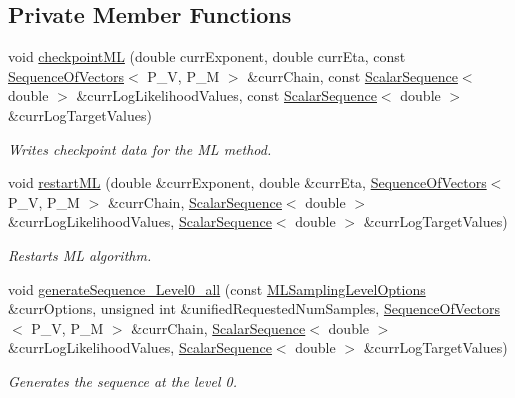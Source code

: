 \subsection*{Private Member Functions}
\begin{DoxyCompactItemize}
\item 
void \hyperlink{class_q_u_e_s_o_1_1_m_l_sampling_aa8e7bb1bd54ccafb9b276127a76eba71}{checkpoint\-M\-L} (double curr\-Exponent, double curr\-Eta, const \hyperlink{class_q_u_e_s_o_1_1_sequence_of_vectors}{Sequence\-Of\-Vectors}$<$ P\-\_\-\-V, P\-\_\-\-M $>$ \&curr\-Chain, const \hyperlink{class_q_u_e_s_o_1_1_scalar_sequence}{Scalar\-Sequence}$<$ double $>$ \&curr\-Log\-Likelihood\-Values, const \hyperlink{class_q_u_e_s_o_1_1_scalar_sequence}{Scalar\-Sequence}$<$ double $>$ \&curr\-Log\-Target\-Values)
\begin{DoxyCompactList}\small\item\em Writes checkpoint data for the M\-L method. \end{DoxyCompactList}\item 
void \hyperlink{class_q_u_e_s_o_1_1_m_l_sampling_aa387be291dd763ce001ea769e87266c4}{restart\-M\-L} (double \&curr\-Exponent, double \&curr\-Eta, \hyperlink{class_q_u_e_s_o_1_1_sequence_of_vectors}{Sequence\-Of\-Vectors}$<$ P\-\_\-\-V, P\-\_\-\-M $>$ \&curr\-Chain, \hyperlink{class_q_u_e_s_o_1_1_scalar_sequence}{Scalar\-Sequence}$<$ double $>$ \&curr\-Log\-Likelihood\-Values, \hyperlink{class_q_u_e_s_o_1_1_scalar_sequence}{Scalar\-Sequence}$<$ double $>$ \&curr\-Log\-Target\-Values)
\begin{DoxyCompactList}\small\item\em Restarts M\-L algorithm. \end{DoxyCompactList}\item 
void \hyperlink{class_q_u_e_s_o_1_1_m_l_sampling_a0a2615d8f3627630d0cb62cb91614bd1}{generate\-Sequence\-\_\-\-Level0\-\_\-all} (const \hyperlink{class_q_u_e_s_o_1_1_m_l_sampling_level_options}{M\-L\-Sampling\-Level\-Options} \&curr\-Options, unsigned int \&unified\-Requested\-Num\-Samples, \hyperlink{class_q_u_e_s_o_1_1_sequence_of_vectors}{Sequence\-Of\-Vectors}$<$ P\-\_\-\-V, P\-\_\-\-M $>$ \&curr\-Chain, \hyperlink{class_q_u_e_s_o_1_1_scalar_sequence}{Scalar\-Sequence}$<$ double $>$ \&curr\-Log\-Likelihood\-Values, \hyperlink{class_q_u_e_s_o_1_1_scalar_sequence}{Scalar\-Sequence}$<$ double $>$ \&curr\-Log\-Target\-Values)
\begin{DoxyCompactList}\small\item\em Generates the sequence at the level 0. \end{DoxyCompactList}\item 

\end{DoxyCompactItemize}
